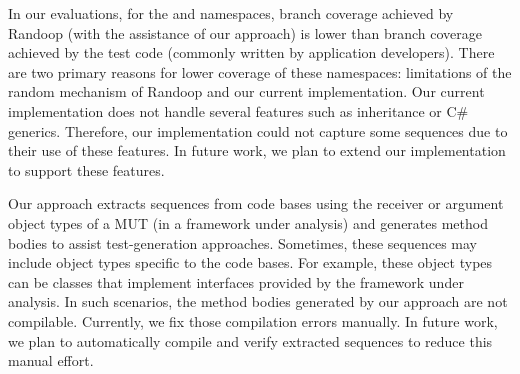 In our evaluations, for the  and  namespaces, branch coverage achieved by Randoop (with the assistance of our approach) is lower than branch coverage achieved by the test code (commonly written by  application developers). There are two primary reasons for lower coverage of these namespaces: limitations of the random mechanism of Randoop and our current implementation. Our current implementation does not handle several features such as inheritance or C\# generics. Therefore, our implementation could not capture some sequences due to their use of these features. In future work, we plan to extend our implementation to support these features. 


Our approach extracts sequences from code bases using the receiver or argument object types of a MUT (in a framework under analysis) and generates method bodies to assist test-generation approaches. Sometimes, these sequences may include object types specific to the code bases. For example, these object types can be classes that implement interfaces provided by the framework under analysis. In such scenarios, the method bodies generated by our approach are not compilable. Currently, we fix those compilation errors manually. In future work, we plan to automatically compile and verify extracted sequences to reduce this manual effort.


